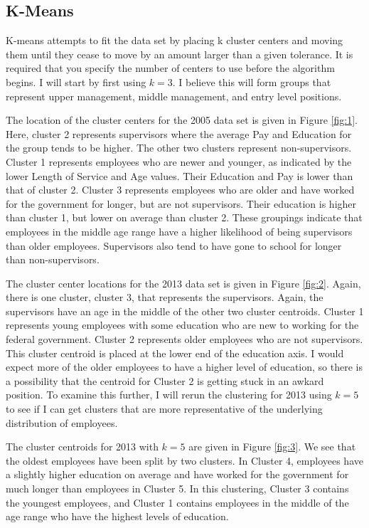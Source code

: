 \documentclass{article}
\begin{document}
    \subsection{K-Means}
    K-means attempts to fit the data set by placing k cluster centers and moving them until they cease to move by an amount larger than a given tolerance. It is required that you specify the number of centers to use before the algorithm begins. I will start by first using $k = 3$. I believe this will form groups that represent upper management, middle management, and entry level positions.
    \par
    The location of the cluster centers for the 2005 data set is given in Figure \ref{fig:1}. Here, cluster 2 represents supervisors where the average Pay and Education for the group tends to be higher. The other two clusters represent non-supervisors. Cluster 1 represents employees who are newer and younger, as indicated by the lower Length of Service and Age values. Their Education and Pay is lower than that of cluster 2. Cluster 3 represents employees who are older and have worked for the government for longer, but are not supervisors. Their education is higher than cluster 1, but lower on average than cluster 2. These groupings indicate that employees in the middle age range have a higher likelihood of being supervisors than older employees. Supervisors also tend to have gone to school for longer than non-supervisors.
    \par
    The cluster center locations for the 2013 data set is given in Figure \ref{fig:2}. Again, there is one cluster, cluster 3, that represents the supervisors. Again, the supervisors have an age in the middle of the other two cluster centroids. Cluster 1 represents young employees with some education who are new to working for the federal government. Cluster 2 represents older employees who are not supervisors. This cluster centroid is placed at the lower end of the education axis. I would expect more of the older employees to have a higher level of education, so there is a possibility that the centroid for Cluster 2 is getting stuck in an awkard position. To examine this further, I will rerun the clustering for 2013 using $k = 5$ to see if I can get clusters that are more representative of the underlying distribution of employees.
    \par
    The cluster centroids for 2013 with $k = 5$ are given in Figure \ref{fig:3}. We see that the oldest employees have been split by two clusters. In Cluster 4, employees have a slightly higher education on average and have worked for the government for much longer than employees in Cluster 5. In this clustering, Cluster 3 contains the youngest employees, and Cluster 1 contains employees in the middle of the age range who have the highest levels of education.
\end{document}
